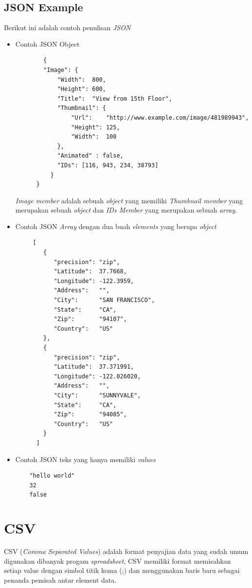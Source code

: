 \subsection{JSON Example}
Berikut ini adalah contoh penulisan \textit{JSON}
\begin{itemize}
    \item Contoh  JSON Object
    \begin{lstlisting}
        {
        "Image": {
            "Width":  800,
            "Height": 600,
            "Title":  "View from 15th Floor",
            "Thumbnail": {
                "Url":    "http://www.example.com/image/481989943",
                "Height": 125,
                "Width":  100
            },
            "Animated" : false,
            "IDs": [116, 943, 234, 38793]
          }
      }
    \end{lstlisting}
    \textit{Image member} adalah sebuah \textit{object} yang memiliki \textit{Thumbnail member} yang merupakan sebuah  \textit{object} dan \textit{IDs Member} yang merupakan sebuah \textit{array}.
    
    \item Contoh JSON \textit{Array} dengan dua buah \textit{elements} yang berupa \textit{object} 
        \begin{lstlisting}
     [
        {
           "precision": "zip",
           "Latitude":  37.7668,
           "Longitude": -122.3959,
           "Address":   "",
           "City":      "SAN FRANCISCO",
           "State":     "CA",
           "Zip":       "94107",
           "Country":   "US"
        },
        {
           "precision": "zip",
           "Latitude":  37.371991,
           "Longitude": -122.026020,
           "Address":   "",
           "City":      "SUNNYVALE",
           "State":     "CA",
           "Zip":       "94085",
           "Country":   "US"
        }
      ]

    \end{lstlisting}
    \item Contoh JSON teks yang hanya memiliki \textit{values} 
    \begin{lstlisting}
    "hello world"
    32 
    false
    \end{lstlisting}
\end{itemize}
   
\section{CSV}
\label{subsec:csv}
CSV (\textit{Comma Separated Values}) adalah format penyajian data yang sudah umum digunakan dibanyak progam \textit{spreadsheet}, CSV memiliki format memisahkan setiap value dengan simbol titik koma (;) dan menggunakan baris baru sebagai penanda pemisah antar element data\cite{RFC:4180}.


